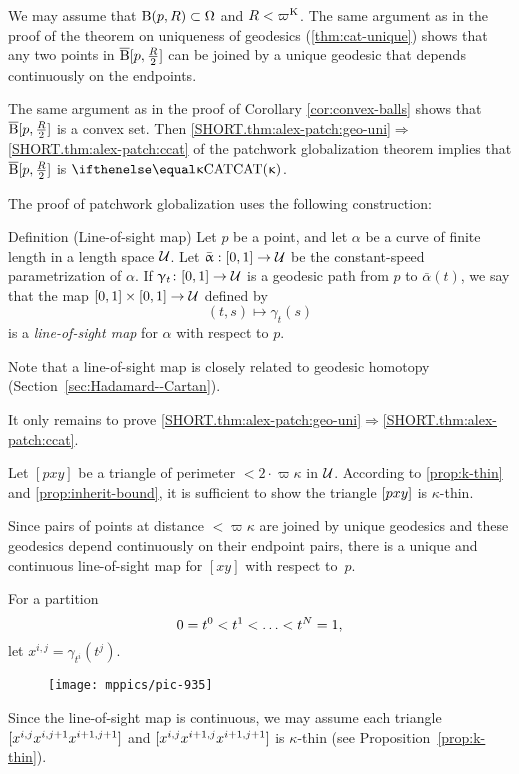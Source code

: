We may assume that $\oBall(p,R)\subset\Omega$ and $R<\varpi\Kappa$.
The same argument as in the proof of the theorem on uniqueness of geodesics (\ref{thm:cat-unique}) 
shows that any two points in $\overline{\mathrm{B}}{}[p,\tfrac R2]$ can be joined by a unique geodesic that depends continuously on the endpoints.

The same argument as in the proof of Corollary \ref{cor:convex-balls} shows that $\overline{\mathrm{B}}{}[p,\tfrac R2]$ is a convex set.
Then \ref{SHORT.thm:alex-patch:geo-uni}$\Rightarrow$\ref{SHORT.thm:alex-patch:ccat} of the patchwork globalization theorem implies that $\overline{\mathrm{B}}{}[p,\tfrac R2]$ is $\CAT\kappa$.
\qeds

The proof of patchwork globalization uses the following construction:

\begin{thm}{Definition (Line-of-sight map)} \label{def:sight}
Let  $p$ be a point, and let $\alpha$ be a curve of finite length in a length space $\mathcal{U}$. 
Let $\bar\alpha:[0,1]\to\spc{U}$ be the constant-speed parametrization of $\alpha$.
If $\gamma_t\:[0,1]\to\spc{U}$ is a geodesic path from $p$ to $\bar\alpha(t)$, we say that the map $[0,1]\times[0,1]\to\spc{U}$ defined by
\[(t,s)\mapsto\gamma_t(s)\]
is a \emph{line-of-sight map} for $\alpha$ with respect to $p$.
\end{thm}

Note that a line-of-sight map is closely related to geodesic homotopy (Section~\ref{sec:Hadamard--Cartan}).

It only remains to prove \ref{SHORT.thm:alex-patch:geo-uni}$\Rightarrow$\ref{SHORT.thm:alex-patch:ccat}.

Let $[p x y]$ be a triangle of perimeter $<2\cdot\varpi\kappa$  in $\mathcal{U}$. 
According to \ref{prop:k-thin} and \ref{prop:inherit-bound}, it is sufficient to show the triangle $[{p}{x}{y}]$ is $\kappa$-thin.

Since pairs of points at distance $<\varpi\kappa$ are joined by unique geodesics and these geodesics depend continuously on their endpoint pairs, there is a unique and continuous line-of-sight map for  $[x y]$ with respect to~$p$.    

For a partition \[0\z=t^0\z<t^1\z<\z\dots\z<t^N=1,\] 
let $x^{i,j}=\gamma_{t^i}(t^j)$. 
\begin{figure}[!ht]
\vskip0mm
\centering
\texttt{[image: mppics/pic-935]}
\end{figure}
Since the line-of-sight map is continuous, we may assume each triangle $[{x^{i,j}}{x^{i,j+1}}{x^{i+1,j+1}}]$ and $[{x^{i,j}}{x^{i+1,j}}{x^{i+1,j+1}}]$ is $\kappa$-thin 
(see Proposition~\ref{prop:k-thin}).

